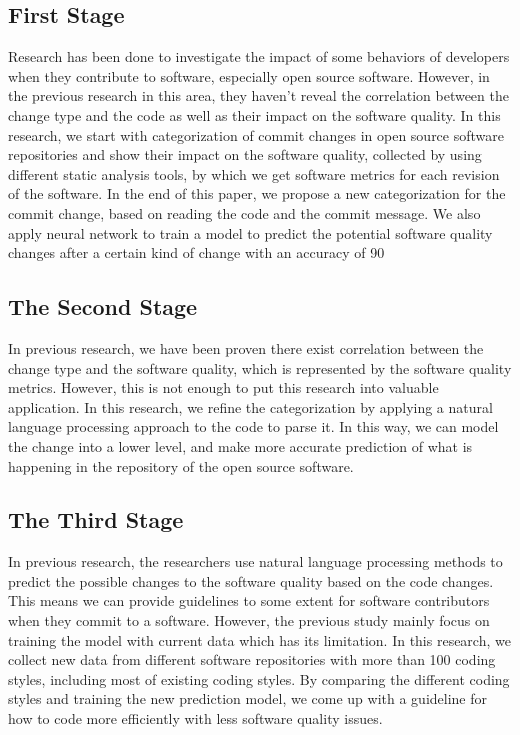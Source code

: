 \documentclass[10pt,conference]{IEEEtran}
\begin{document}
\subsection{First Stage}
Research has been done to investigate the impact of some behaviors of developers when they contribute to software, especially open source software. However, in the previous research in this area, they haven't reveal the correlation between the change type and the code as well as their impact on the software quality. In this research, we start with categorization of commit changes in open source software repositories and show their impact on the software quality, collected by using different static analysis tools, by which we get software metrics for each revision of the software. In the end of this paper, we propose a new categorization for the commit change, based on reading the code and the commit message. We also apply neural network to train a model to predict the potential software quality changes after a certain kind of change with an accuracy of 90%


\subsection{The Second Stage}
In previous research, we have been proven there exist correlation between the change type and the software quality, which is represented by the software quality metrics. However, this is not enough to put this research into valuable application. In this research, we refine the categorization by applying a natural language processing approach to the code to parse it. In this way, we can model the change into a lower level, and make more accurate prediction of what is happening in the repository of the open source software. 


\subsection{The Third Stage}
In previous research, the researchers use natural language processing methods to predict the possible changes to the software quality based on the code changes. This means we can provide guidelines to some extent for software contributors when they commit to a software. However, the previous study mainly focus on training the model with current data which has its limitation. In this research, we collect new data from different software repositories with more than 100 coding styles, including most of existing coding styles. By comparing the different coding styles and training the new prediction model, we come up with a guideline for how to code more efficiently with less software quality issues.



\medskip
%
%

\vspace{12pt}
\color{red}
\end{document}
